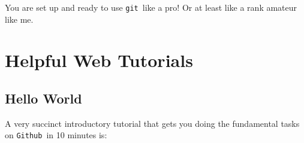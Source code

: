 \documentclass[14pt]{amsart}
\newcommand{\git}{{\texttt{git}}}
\newcommand{\github}{{\texttt{Github}}}
\begin{document}
You are set up and ready to use \git\ like a pro!  Or at least like a rank amateur like me.

\section{Helpful Web Tutorials}

\subsection{Hello World}

A very succinct introductory tutorial that gets you doing the fundamental tasks on \github\ in 10 minutes is: 
\end{document}
